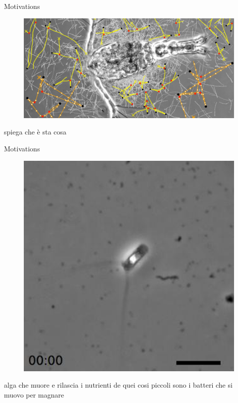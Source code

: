 \documentclass{beamer}
\begin{document}
		\begin{frame}{Motivations}
				\begin{figure}
					\centering
					\includegraphics[scale=0.30]{./images/motivations2.png}
				\end{figure}

				\begin{itemize}
					spiega che è sta cosa
				\end{itemize}

	\end{frame}
	
	
		\begin{frame}{Motivations}
				\begin{figure}
					\centering
					\includegraphics[scale=0.30]{./images/motivations3.png}
				\end{figure}

				\begin{itemize}
				alga che muore e rilascia i nutrienti de quei cosi piccoli sono i batteri che si muovo per magnare
				\end{itemize}

	\end{frame}
	
\end{document}
